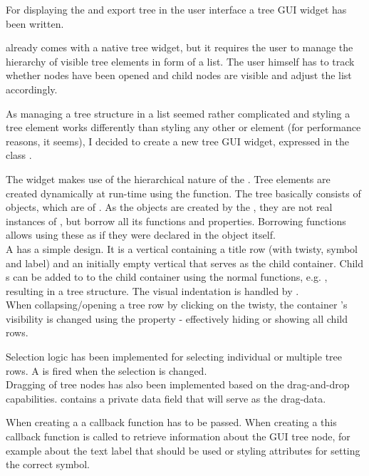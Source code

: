 For displaying the  and export tree in the user interface a tree GUI widget has been written.

 already comes with a native tree widget, but it requires the user to manage the hierarchy of visible tree elements in form of a list. The user himself has to track whether nodes have been opened and child nodes are visible and adjust the list accordingly.

As managing a tree structure in a list seemed rather complicated and styling a  tree element works differently than styling any other  or  element (for performance reasons, it seems), I decided to create a new tree GUI widget, expressed in the class .

The widget makes use of the hierarchical nature of the  . Tree elements are created dynamically at run-time using the \linebreak{} function. The tree basically consists of   objects, which are  of . As the  objects are created by the , they are not real instances of , but borrow all its functions and properties. Borrowing functions allows using these as if they were declared in the object itself.\\
A  has a simple design. It is a vertical  containing a title row (with twisty, symbol and label) and an initially empty vertical  that serves as the child container. Child s can be added to to the child container using the normal  functions, e.g. , resulting in a tree structure. The visual indentation is handled by .\\
When collapsing/opening a tree row by clicking on the twisty, the container 's visibility is changed using the   property - effectively hiding or showing all child rows.

Selection logic has been implemented for selecting individual or multiple tree rows. A   is fired when the selection is changed.\\
Dragging of tree nodes has also been implemented based on the  drag-and-drop capabilities.  contains a private data field that will serve as the drag-data.

When creating a  a callback function has to be passed. When creating a  this callback function is called to retrieve information about the GUI tree node, for example about the text label that should be used or styling attributes for setting the correct symbol.



